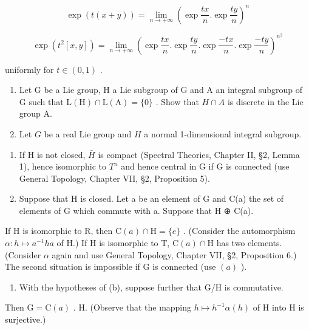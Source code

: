 \[
\exp (t (x + y)) = \lim _ {n \rightarrow + \infty} \left(\exp \frac {t x}{n}. \exp \frac {t y}{n}\right) ^ {n}
\]

\[
\exp (t ^ {2} [ x, y ]) = \lim _ {n \rightarrow + \infty} \left(\exp \frac {t x}{n}. \exp \frac {t y}{n}. \exp \frac {- t x}{n}. \exp \frac {- t y}{n}\right) ^ {n ^ {2}}
\]

uniformly for \(t \in (0, 1)\) .

\begin{enumerate}
\def\labelenumi{\arabic{enumi}.}
\setcounter{enumi}{19}
\item
  Let G be a Lie group, H a Lie subgroup of G and A an integral subgroup of G such that \(\mathrm{L}(\mathrm{H}) \cap \mathrm{L}(\mathrm{A}) = \{0\}\) . Show that \(H \cap A\) is discrete in the Lie group A.
\item
  Let \(G\) be a real Lie group and \(H\) a normal 1-dimensional integral subgroup.
\end{enumerate}

\begin{enumerate}
\def\labelenumi{(\alph{enumi})}
\item
  If H is not closed, \(\bar{H}\) is compact (Spectral Theories, Chapter II, §2, Lemma 1), hence isomorphic to \(T^{n}\) and hence central in G if G is connected (use General Topology, Chapter VII, §2, Proposition 5).
\item
  Suppose that H is closed. Let a be an element of G and C(a) the set of elements of G which commute with a. Suppose that H ⊕ C(a).
\end{enumerate}

If H is isomorphic to R, then \(\mathrm{C}(a) \cap \mathrm{H} = \{e\}\) . (Consider the automorphism \(\alpha: h \mapsto a^{-1}ha\) of H.) If H is isomorphic to T, \(\mathrm{C}(a) \cap \mathrm{H}\) has two elements. (Consider \(\alpha\) again and use General Topology, Chapter VII, §2, Proposition 6.) The second situation is impossible if G is connected (use \((a)\) ).

\begin{enumerate}
\def\labelenumi{(\alph{enumi})}
\setcounter{enumi}{2}
\tightlist
\item
  With the hypotheses of (b), suppose further that G/H is commutative.
\end{enumerate}

Then \(\mathrm{G} = \mathrm{C}(a)\) . H. (Observe that the mapping \(h \mapsto h^{-1}\alpha(h)\) of H into H is surjective.)

